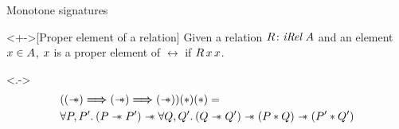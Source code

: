 \documentclass[aspectratio=169]{beamer}
\begin{document}
\begin{frame}{Monotone signatures}
    \begin{definition}<+->[Proper element of a relation]
        Given a relation $R\colon\textit{iRel}\ A$ and an element $x\in A$, $x$ is a proper element of $\rel$ if $R\, x\, x$.
    \end{definition}
    \begin{uncoverenv}<.->
        \vspace*{-.5cm}
        \begin{align*}
             & (\wandrel \respect \wandrel \respect \wandrel) (*) (*) =                                                                                    \\
             & \All \prop, \prop'. (\prop \wand \prop') \wand \All \propB, \propB'. (\propB \wand \propB') \wand (\prop * \propB) \wand (\prop' * \propB')
        \end{align*}
    \end{uncoverenv}

\end{frame}
\end{document}
